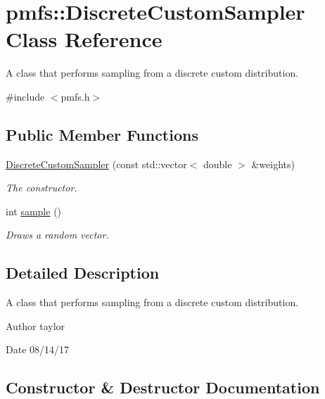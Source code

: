 \hypertarget{classpmfs_1_1DiscreteCustomSampler}{}\section{pmfs\+:\+:Discrete\+Custom\+Sampler Class Reference}
\label{classpmfs_1_1DiscreteCustomSampler}


A class that performs sampling from a discrete custom distribution.  




{\ttfamily \#include $<$pmfs.\+h$>$}

\subsection*{Public Member Functions}
\begin{DoxyCompactItemize}
\item 
\hyperlink{classpmfs_1_1DiscreteCustomSampler_a141e85ed03a8a93a4359415441b4166b}{Discrete\+Custom\+Sampler} (const std\+::vector$<$ double $>$ \&weights)
\begin{DoxyCompactList}\small\item\em The constructor. \end{DoxyCompactList}\item 
int \hyperlink{classpmfs_1_1DiscreteCustomSampler_ad449b68933655c879b567a085ea42a80}{sample} ()
\begin{DoxyCompactList}\small\item\em Draws a random vector. \end{DoxyCompactList}\end{DoxyCompactItemize}


\subsection{Detailed Description}
A class that performs sampling from a discrete custom distribution. 

\begin{DoxyAuthor}{Author}
taylor 
\end{DoxyAuthor}
\begin{DoxyDate}{Date}
08/14/17 
\end{DoxyDate}


\subsection{Constructor \& Destructor Documentation}

